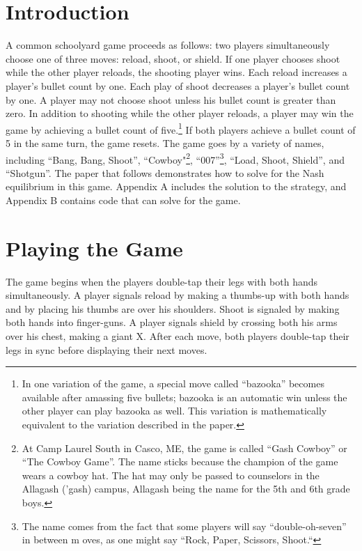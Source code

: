 \documentclass[11pt]{article}
\begin{document}
\begin{multicols}{2}

\section{Introduction}

A common schoolyard game proceeds as follows: two players simultaneously choose one of three moves: reload, shoot, or shield. If one player chooses shoot while the other player reloads, the shooting player wins. Each reload increases a player's bullet count by one. Each play of shoot decreases a player's bullet count by one. A player may not choose shoot unless his bullet count is greater than zero. In addition to shooting while the other player reloads, a player may win the game by achieving a bullet count of five.\footnote{In one variation of the game, a special move called ``bazooka'' becomes available after amassing five bullets; bazooka is an automatic win unless the other player can play bazooka as well. This variation is mathematically equivalent to the variation described in the paper.} If both players achieve a bullet count of 5 in the same turn, the game resets. The game goes by a variety of names, including ``Bang, Bang, Shoot'', ``Cowboy"\footnote{At Camp Laurel South in Casco, ME, the game is called ``Gash Cowboy'' or ``The Cowboy Game''. The name sticks because the  champion of the game wears a cowboy hat. The hat may only be passed to counselors in the Allagash ('gash) campus, Allagash being the name for the 5th and 6th grade boys.}, ``007''\footnote{The name comes from the fact that some players will say ``double-oh-seven'' in between m oves, as one might say ``Rock, Paper, Scissors, Shoot.``}, ``Load, Shoot, Shield'', and ``Shotgun''. The paper that follows demonstrates how to solve for the Nash equilibrium in this game. Appendix A includes the solution to the strategy, and Appendix B contains code that can solve for the game.

\section{Playing the Game}

The game begins when the players double-tap their legs with both hands simultaneously. A player signals reload by making a thumbs-up with both hands and by placing his thumbs are over his shoulders. Shoot is signaled by making both hands into finger-guns. A player signals shield by crossing both his arms over his chest, making a giant X. After each move, both players double-tap their legs in sync before displaying their next moves.


\end{multicols}
\end{document}
